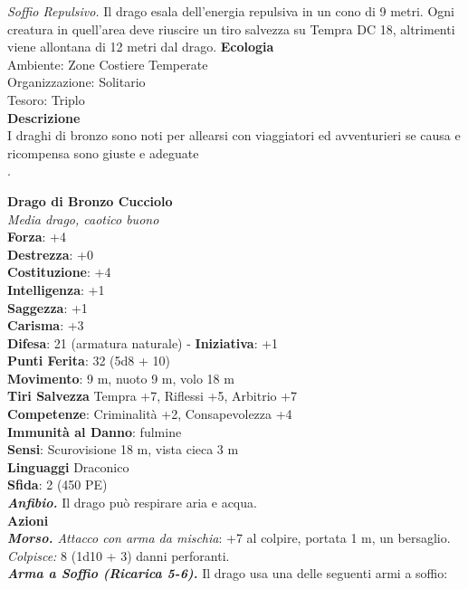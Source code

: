 \begin{multicols}{2}
\emph{Soffio Repulsivo.} Il drago esala dell'energia repulsiva in un cono di 9 metri. Ogni creatura in quell'area deve riuscire un tiro salvezza su Tempra DC  18, altrimenti viene allontana di 12 metri dal drago.
\textbf{Ecologia}\\
Ambiente: Zone Costiere Temperate\\
Organizzazione: Solitario\\
Tesoro: Triplo\\
\textbf{Descrizione}\\
I draghi di bronzo sono noti per allearsi con viaggiatori ed avventurieri se causa e ricompensa sono giuste e adeguate\\
.

\medskip\textbf{Drago di Bronzo Cucciolo}\\
\emph{Media drago, caotico buono}\\
\textbf{Forza}: +4\\
\textbf{Destrezza}: +0\\
\textbf{Costituzione}: +4\\
\textbf{Intelligenza}: +1\\
\textbf{Saggezza}: +1\\
\textbf{Carisma}: +3\\
\textbf{Difesa}: 21 (armatura naturale) - \textbf{Iniziativa}: +1\\
\textbf{Punti Ferita}: 32 (5d8 + 10)\\
\textbf{Movimento}: 9 m, nuoto 9 m, volo 18 m\\
\textbf{Tiri Salvezza} Tempra +7, Riflessi +5, Arbitrio +7\\
\textbf{Competenze}: Criminalità +2, Consapevolezza +4\\
\textbf{Immunità al Danno}: fulmine\\
\textbf{Sensi}: Scurovisione 18 m, vista cieca 3 m\\
\textbf{Linguaggi} Draconico\\
\textbf{Sfida}: 2 (450 PE)\smallskip\\
\emph{\textbf{Anfibio.}} Il drago può respirare aria e acqua.\\
\smallskip\textbf{Azioni}\\
\emph{\textbf{Morso.} Attacco con arma da mischia}: +7 al colpire, portata 1 m, un bersaglio.\\
\emph{Colpisce:} 8 (1d10 + 3) danni perforanti.\\
\emph{\textbf{Arma a Soffio (Ricarica 5-6).}} Il drago usa una delle seguenti armi a soffio:\\

\end{multicols}
